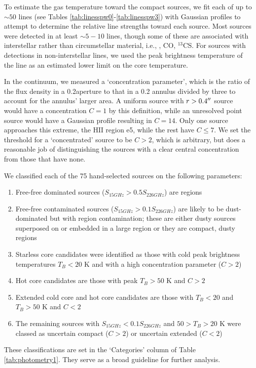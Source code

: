 \documentclass{aa}
\begin{document}
To estimate the gas temperature toward the compact sources, we fit each of up
to $\sim50$ lines (see Tables \ref{tab:linesspw0}-\ref{tab:linesspw3}) with
Gaussian profiles to attempt to determine the relative line strengths toward
each source.  Most sources were detected in at least $\sim5-10$ lines, though
some of these are associated with interstellar rather than circumstellar
material, i.e., \formaldehyde, CO, $^{13}$CS.  For sources with detections in
non-interstellar lines, we used the peak brightness temperature of the line as
an estimated lower limit on the core temperature.

In the continuum, we measured a `concentration parameter', which is the ratio
of the flux density in a 0.2\arcsec aperture to that in a 0.2\arcsec
annulus divided by three to account for the annulus' larger area.  A uniform
source with $r>0.4\mbox{$^{\prime\prime}$}$ source would have a concentration $C=1$ by this
definition, while an unresolved point source would have a Gaussian profile
resulting in $C=14$.  Only one source approaches this extreme, the HII region
e5, while the rest have $C\leq7$.  We set the threshold for a `concentrated'
source to be $C>2$, which is arbitrary, but does a reasonable job of
distinguishing the sources with a clear central concentration from those that
have none.


We classified each of the 75 hand-selected sources on the following parameters:
\begin{enumerate}
    \item Free-free dominated sources ($S_{15 GHz} > 0.5 S_{226 GHz}$) are \hii
        regions
    \item Free-free contaminated sources ($S_{15 GHz} > 0.1 S_{226 GHz}$) are
        likely to be dust-dominated but with \hii region contamination; these
        are either dusty sources superposed on or embedded in a large \hii
        region or they are compact, dusty \hii regions
    \item Starless core candidates were identified as those with cold peak
        brightness temperatures $T_B < 20$ K and with a high concentration
        parameter ($C>2$)
    \item Hot core candidates are those with peak $T_B>50$ K and $C>2$
    \item Extended cold core and hot core candidates are those with $T_B<20$ 
        and $T_B>50$ K and $C<2$
    \item The remaining sources with $S_{15 GHz} < 0.1 S_{226 GHz}$ and $50 >
        T_B > 20$ K were classed as uncertain compact ($C>2$) or uncertain extended
        ($C<2$)
\end{enumerate}

These classifications are set in the `Categories' column of Table
\ref{tab:photometry1}.  They serve as a broad guideline for further
analysis.   


\end{document}
